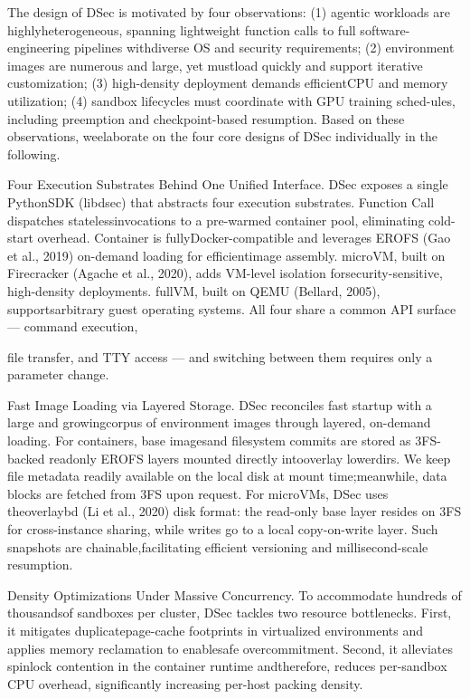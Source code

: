 \documentclass[
  10
]{article}
\begin{document}
The design of DSec is motivated by four observations: (1) agentic
workloads are highlyheterogeneous, spanning lightweight function calls
to full software-engineering pipelines withdiverse OS and security
requirements; (2) environment images are numerous and large, yet
mustload quickly and support iterative customization; (3) high-density
deployment demands efficientCPU and memory utilization; (4) sandbox
lifecycles must coordinate with GPU training sched-ules, including
preemption and checkpoint-based resumption. Based on these observations,
weelaborate on the four core designs of DSec individually in the
following.

Four Execution Substrates Behind One Unified Interface. DSec exposes a
single PythonSDK (libdsec) that abstracts four execution substrates.
Function Call dispatches statelessinvocations to a pre-warmed container
pool, eliminating cold-start overhead. Container is
fullyDocker-compatible and leverages EROFS (Gao et al., 2019) on-demand
loading for efficientimage assembly. microVM, built on Firecracker
(Agache et al., 2020), adds VM-level isolation forsecurity-sensitive,
high-density deployments. fullVM, built on QEMU (Bellard, 2005),
supportsarbitrary guest operating systems. All four share a common API
surface --- command execution,

file transfer, and TTY access --- and switching between them requires
only a parameter change.

Fast Image Loading via Layered Storage. DSec reconciles fast startup
with a large and growingcorpus of environment images through layered,
on-demand loading. For containers, base imagesand filesystem commits are
stored as 3FS-backed readonly EROFS layers mounted directly intooverlay
lowerdirs. We keep file metadata readily available on the local disk at
mount time;meanwhile, data blocks are fetched from 3FS upon request. For
microVMs, DSec uses theoverlaybd (Li et al., 2020) disk format: the
read-only base layer resides on 3FS for cross-instance sharing, while
writes go to a local copy-on-write layer. Such snapshots are
chainable,facilitating efficient versioning and millisecond-scale
resumption.

Density Optimizations Under Massive Concurrency. To accommodate hundreds
of thousandsof sandboxes per cluster, DSec tackles two resource
bottlenecks. First, it mitigates duplicatepage-cache footprints in
virtualized environments and applies memory reclamation to enablesafe
overcommitment. Second, it alleviates spinlock contention in the
container runtime andtherefore, reduces per-sandbox CPU overhead,
significantly increasing per-host packing density.
\end{document}
